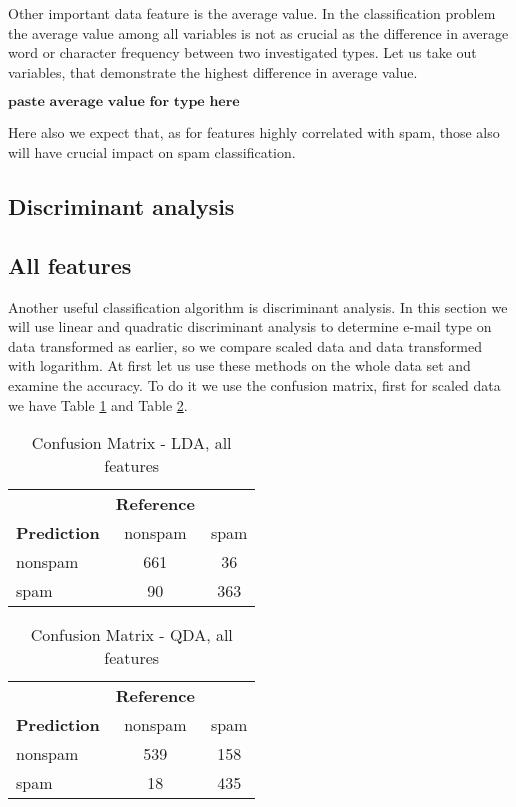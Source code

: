 \documentclass[12pt, letter paper]{article}
\begin{document}
	Other important data feature is the average value. In the classification problem the average value among all variables is not as crucial as the difference in average word or character frequency between two investigated types. Let us take out variables, that demonstrate the highest difference in average value.
	
	$\textbf{paste average value for type here}$
	
	Here also we expect that, as for features highly correlated with spam, those also will have crucial impact on spam classification.
	
	\subsection{Discriminant analysis}
	
	\subsection*{All features}
	
	Another useful classification algorithm is discriminant analysis. In this section we will use linear and quadratic discriminant analysis to determine e-mail type on data transformed as earlier, so we compare scaled data and data transformed with logarithm. At first let us use these methods on the whole data set and examine the accuracy. To do it we use the confusion matrix, first for scaled data we have Table \ref{tab:confusion_matrix_lda1} and Table \ref{tab:confusion_matrix_qda1}.
	
	\begin{table}[h]
		\centering
		\begin{tabular}{lcc}
			& \textbf{Reference} & \\
			\textbf{Prediction} & nonspam & spam \\
			nonspam & 661 & 36 \\
			spam & 90 & 363 \\
		\end{tabular}
		\caption{Confusion Matrix - LDA, all features}
		\label{tab:confusion_matrix_lda1}
	\end{table}
	
	\begin{table}[h]
		\centering
		\begin{tabular}{lcc}
			& \textbf{Reference} & \\
			\textbf{Prediction} & nonspam & spam \\
			nonspam & 539 & 158 \\
			spam & 18 & 435 \\
		\end{tabular}
		\caption{Confusion Matrix - QDA, all features}
		\label{tab:confusion_matrix_qda1}
	\end{table}
\end{document}
